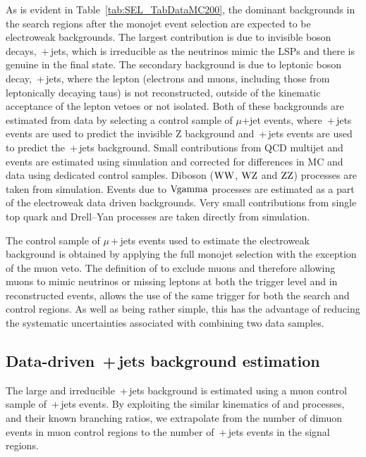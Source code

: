 As is evident in Table~\ref{tab:SEL_TabDataMC200}, the dominant backgrounds in the search regions after the monojet event selection are expected to be electroweak backgrounds.
The largest contribution is due to invisible \Z{} boson decays, \znunubr{}\,+\,jets, which is irreducible as the neutrinos mimic the \ac{LSP}s and there is genuine \MET in the final state. 
The secondary background is due to leptonic \W{} boson decay, \wlnubr{}\,+\,jets, where the lepton (electrons and muons, including those from leptonically decaying taus) is not reconstructed, outside of the kinematic acceptance of the lepton vetoes or not isolated.
Both of these backgrounds are estimated from data by selecting a control sample of $\mu$+jet events, where \zmumubr{}\,+\,jets events are used to predict the invisible Z background and \wmunubr{}\,+\,jets events are used to predict the \wlnubr{}\,+\,jets background.
Small contributions from \ac{QCD} multijet and \ttbar{} events are estimated using simulation and corrected for differences in MC and data using dedicated control samples.
Diboson ($\W\W${}, $\W\Z${} and $\Z\Z${}) processes are taken from simulation. Events due to $\rm{V}\gamma$ processes are estimated as a part of the electroweak data driven backgrounds.
Very small contributions from single top quark and Drell--Yan processes are taken directly from simulation.


The control sample of $\mu$\,+\,jets events used to estimate the electroweak background is 
obtained by applying the full monojet selection with the exception of the muon veto.
The definition of \METmu to exclude muons and therefore allowing muons to mimic neutrinos or missing leptons at both the trigger level and in reconstructed events, allows the use of the same trigger for both the search and control regions. 
As well as being rather simple, this has the advantage of reducing the systematic uncertainties associated with combining two data samples.

\subsection{Data-driven \znunubr{}\,+\,jets background estimation}
\label{sec:znunu}

The large and irreducible \znunubr{}\,+\,jets background is estimated using a muon control sample of \zmumubr{}\,+\,jets events.
By exploiting the similar kinematics of \znunu and \zmumu processes, and their known branching ratios, we extrapolate from the number of dimuon events in muon control regions to the number of \znunubr{}\,+\,jets events in the signal regions.

